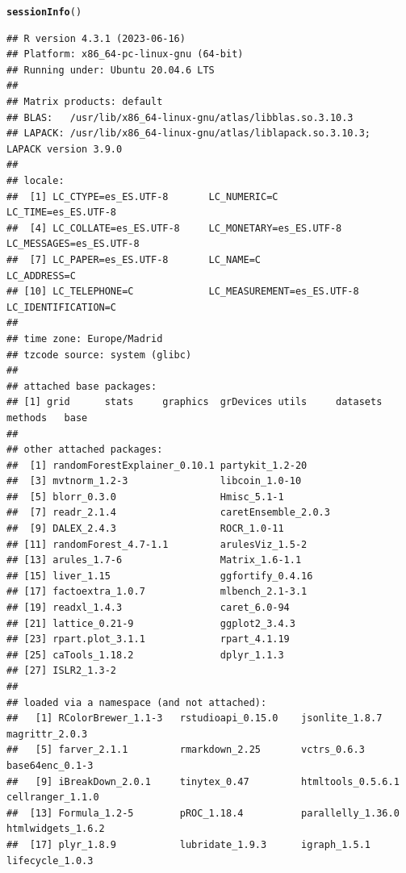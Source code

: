 \documentclass{article}\usepackage[]{graphicx}\usepackage[]{xcolor}
\makeatletter
\newcommand{\hlstd}[1]{\textcolor[rgb]{0.345,0.345,0.345}{#1}}%
\newcommand{\hlkwd}[1]{\textcolor[rgb]{0.737,0.353,0.396}{\textbf{#1}}}%
\newenvironment{kframe}{%
 \def\at@end@of@kframe{}%
 \ifinner\ifhmode%
  \def\at@end@of@kframe{\end{minipage}}%
  \begin{minipage}{\columnwidth}%
 \fi\fi%
 \def\FrameCommand##1{\hskip\@totalleftmargin \hskip-\fboxsep
 \colorbox{shadecolor}{##1}\hskip-\fboxsep
     \hskip-\linewidth \hskip-\@totalleftmargin \hskip\columnwidth}%
 \MakeFramed {\advance\hsize-\width
   \@totalleftmargin\z@ \linewidth\hsize
   \@setminipage}}%
 {\par\unskip\endMakeFramed%
 \at@end@of@kframe}
\newenvironment{knitrout}{}{} %
\makeatother
\begin{document}
\begin{knitrout}
\color{fgcolor}\begin{kframe}
\begin{alltt}
\hlkwd{sessionInfo}\hlstd{()}
\end{alltt}
\begin{verbatim}
## R version 4.3.1 (2023-06-16)
## Platform: x86_64-pc-linux-gnu (64-bit)
## Running under: Ubuntu 20.04.6 LTS
## 
## Matrix products: default
## BLAS:   /usr/lib/x86_64-linux-gnu/atlas/libblas.so.3.10.3 
## LAPACK: /usr/lib/x86_64-linux-gnu/atlas/liblapack.so.3.10.3;  LAPACK version 3.9.0
## 
## locale:
##  [1] LC_CTYPE=es_ES.UTF-8       LC_NUMERIC=C               LC_TIME=es_ES.UTF-8       
##  [4] LC_COLLATE=es_ES.UTF-8     LC_MONETARY=es_ES.UTF-8    LC_MESSAGES=es_ES.UTF-8   
##  [7] LC_PAPER=es_ES.UTF-8       LC_NAME=C                  LC_ADDRESS=C              
## [10] LC_TELEPHONE=C             LC_MEASUREMENT=es_ES.UTF-8 LC_IDENTIFICATION=C       
## 
## time zone: Europe/Madrid
## tzcode source: system (glibc)
## 
## attached base packages:
## [1] grid      stats     graphics  grDevices utils     datasets  methods   base     
## 
## other attached packages:
##  [1] randomForestExplainer_0.10.1 partykit_1.2-20             
##  [3] mvtnorm_1.2-3                libcoin_1.0-10              
##  [5] blorr_0.3.0                  Hmisc_5.1-1                 
##  [7] readr_2.1.4                  caretEnsemble_2.0.3         
##  [9] DALEX_2.4.3                  ROCR_1.0-11                 
## [11] randomForest_4.7-1.1         arulesViz_1.5-2             
## [13] arules_1.7-6                 Matrix_1.6-1.1              
## [15] liver_1.15                   ggfortify_0.4.16            
## [17] factoextra_1.0.7             mlbench_2.1-3.1             
## [19] readxl_1.4.3                 caret_6.0-94                
## [21] lattice_0.21-9               ggplot2_3.4.3               
## [23] rpart.plot_3.1.1             rpart_4.1.19                
## [25] caTools_1.18.2               dplyr_1.1.3                 
## [27] ISLR2_1.3-2                 
## 
## loaded via a namespace (and not attached):
##   [1] RColorBrewer_1.1-3   rstudioapi_0.15.0    jsonlite_1.8.7       magrittr_2.0.3      
##   [5] farver_2.1.1         rmarkdown_2.25       vctrs_0.6.3          base64enc_0.1-3     
##   [9] iBreakDown_2.0.1     tinytex_0.47         htmltools_0.5.6.1    cellranger_1.1.0    
##  [13] Formula_1.2-5        pROC_1.18.4          parallelly_1.36.0    htmlwidgets_1.6.2   
##  [17] plyr_1.8.9           lubridate_1.9.3      igraph_1.5.1         lifecycle_1.0.3     

\end{verbatim}
\end{kframe}
\end{knitrout}
\end{document}
